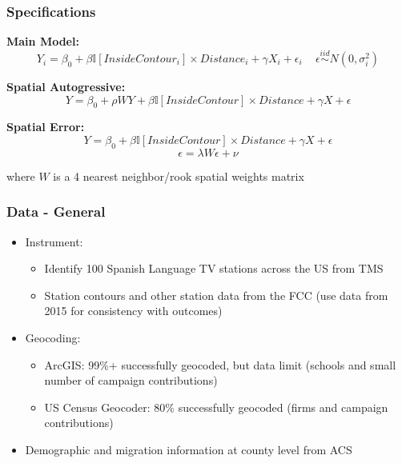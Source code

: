 \documentclass{beamer}
\begin{document}
\begin{frame}
\frametitle{Specifications}

\textbf{Main Model:}
\[ Y_i^{} = \beta_0 + \beta \mathbb{I}[InsideContour_i] \times Distance_i + \gamma X_i + \epsilon_i \, \, \, \, \, \, \, \epsilon \stackrel{iid}{\sim}   N(0,\sigma_i^{2})\]

\textbf{Spatial Autogressive:}
\[ Y = \beta_0 + \rho W Y + \beta \mathbb{I}[InsideContour] \times Distance + \gamma X + \epsilon \]

\textbf{Spatial Error:}
\[ Y = \beta_0 + \beta \mathbb{I}[InsideContour] \times Distance + \gamma X + \epsilon \]
\[\epsilon = \lambda W \epsilon + \nu\]

where $W$ is a 4 nearest neighbor/rook spatial weights matrix

\end{frame}

\begin{frame}
\frametitle{Data - General}

\begin{itemize}
\item Instrument:
\begin{itemize}
\item Identify 100 Spanish Language TV stations across the US from TMS
\item Station contours and other station data from the FCC (use data from 2015 for consistency with outcomes)
\end{itemize}
\item Geocoding:
\begin{itemize}
\item ArcGIS: 99\%+ successfully geocoded, but data limit (schools and small number of campaign contributions)
\item US Census Geocoder: 80\% successfully geocoded (firms and campaign contributions)
\end{itemize}
\item Demographic and migration information at county level from ACS
\end{itemize}

\end{frame}
\end{document}
